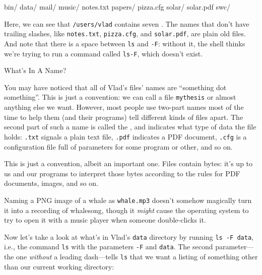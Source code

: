 \documentclass{book}
\begin{document}

\begin{VerbOut}
bin/         data/     mail/      music/
notes.txt    papers/   pizza.cfg  solar/
solar.pdf    swc/
\end{VerbOut}

Here, we can see that \texttt{/users/vlad} contains seven
. The names that don't have
trailing slashes, like \texttt{notes.txt}, \texttt{pizza.cfg}, and
\texttt{solar.pdf}, are plain old files. And note that there is a space
between \texttt{ls} and \texttt{-F}: without it, the shell thinks we're
trying to run a command called \texttt{ls-F}, which doesn't exist.

\begin{swcbox}{What's In A Name?}

You may have noticed that all of Vlad's files' names are ``something dot
something''. This is just a convention: we can call a file
\texttt{mythesis} or almost anything else we want. However, most people
use two-part names most of the time to help them (and their programs)
tell different kinds of files apart. The second part of such a name is
called the , and
indicates what type of data the file holds: \texttt{.txt} signals a
plain text file, \texttt{.pdf} indicates a PDF document, \texttt{.cfg}
is a configuration file full of parameters for some program or other,
and so on.

This is just a convention, albeit an important one. Files contain bytes:
it's up to us and our programs to interpret those bytes according to the
rules for PDF documents, images, and so on.

Naming a PNG image of a whale as \texttt{whale.mp3} doesn't somehow
magically turn it into a recording of whalesong, though it \emph{might}
cause the operating system to try to open it with a music player when
someone double-clicks it.

\end{swcbox}

Now let's take a look at what's in Vlad's \texttt{data} directory by
running \texttt{ls -F data}, i.e., the command \texttt{ls} with the
parameters \texttt{-F} and \texttt{data}. The second parameter---the one
\emph{without} a leading dash---tells \texttt{ls} that we want a listing
of something other than our current working directory:
\end{document}
